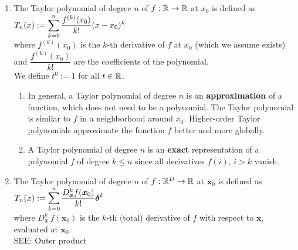 \begin{enumerate}
    \item
    \begin{definition}
        The Taylor polynomial of degree $n$ of $f : \mathbb{R} \to \mathbb{R}$ at $x_0$ is defined as
        $
            T_n(x)
            := \displaystyle\sum_{k=0}^n \dfrac{f^{(k)}(x_0)}{k!} (x - x_0)^k
        $
        \hfill \cite{mfml/book/mml/Deisenroth-Faisal-Ong}
        \\
        where $f ^{(k)}(x_0)$ is the $k$-th derivative of $f$ at $x_0$ (which we assume exists) and $\dfrac{f ^{(k)}(x_0)}{ k!}$ are the coefficients of the polynomial.
        \hfill \cite{mfml/book/mml/Deisenroth-Faisal-Ong}
        \\
        We define $t^0 := 1$ for all $t \in \mathbb{R}$.
        \hfill \cite{mfml/book/mml/Deisenroth-Faisal-Ong}
    \end{definition}
    \begin{enumerate}
        \item In general, a Taylor polynomial of degree $n$ is an \textbf{approximation} of a function, which does not need to be a polynomial.
        The Taylor polynomial is similar to $f$ in a neighborhood around $x_0$.
        Higher-order Taylor polynomials approximate the function $f$ better and more globally.
        \hfill \cite{mfml/book/mml/Deisenroth-Faisal-Ong}

        \item A Taylor polynomial of degree $n$ is an \textbf{exact} representation of a polynomial $f$ of degree $k \leq n$ since all derivatives $f (i)$, $i > k$ vanish.
        \hfill \cite{mfml/book/mml/Deisenroth-Faisal-Ong}
    \end{enumerate}

    \item
    \begin{definition}
        The Taylor polynomial of degree $n$ of $f : \mathbb{R}^D \to \mathbb{R}$ at $\bm{x}_0$ is defined as
        $
            T_n(x)
            := \displaystyle\sum_{k=0}^n \dfrac{D^k_{\bm{x}} f(\bm{x}_0)}{k!} \bm{\delta}^k
        $
        \hfill \cite{mfml/book/mml/Deisenroth-Faisal-Ong}
        \\
        where $D^k _{\bm{x}}\ f (\bm{x}_0)$ is the $k$-th (total) derivative of $f$ with respect to $\bm{x}$, evaluated at $\bm{x}_0$.
        \\
        SEE: Outer product
        \hfill \cite{mfml/book/mml/Deisenroth-Faisal-Ong}
    \end{definition}
\end{enumerate}


















